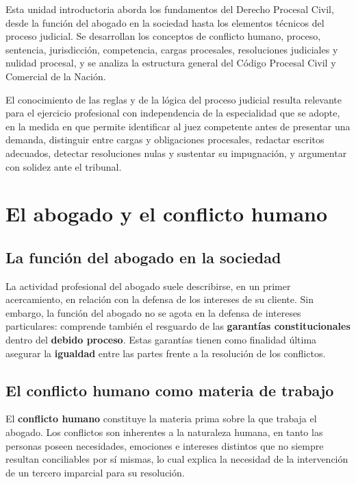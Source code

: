 \documentclass[12pt,oneside]{book}
\begin{document}
Esta unidad introductoria aborda los fundamentos del Derecho Procesal Civil, desde la función del abogado en la sociedad hasta los elementos técnicos del proceso judicial. Se desarrollan los conceptos de conflicto humano, proceso, sentencia, jurisdicción, competencia, cargas procesales, resoluciones judiciales y nulidad procesal, y se analiza la estructura general del Código Procesal Civil y Comercial de la Nación.

El conocimiento de las reglas y de la lógica del proceso judicial resulta relevante para el ejercicio profesional con independencia de la especialidad que se adopte, en la medida en que permite identificar al juez competente antes de presentar una demanda, distinguir entre cargas y obligaciones procesales, redactar escritos adecuados, detectar resoluciones nulas y sustentar su impugnación, y argumentar con solidez ante el tribunal.

\section{El abogado y el conflicto humano}

\subsection{La función del abogado en la sociedad}

La actividad profesional del abogado suele describirse, en un primer acercamiento, en relación con la defensa de los intereses de su cliente. Sin embargo, la función del abogado no se agota en la defensa de intereses particulares: comprende también el resguardo de las \textbf{garantías constitucionales} dentro del \textbf{debido proceso}. Estas garantías tienen como finalidad última asegurar la \textbf{igualdad} entre las partes frente a la resolución de los conflictos.

\subsection{El conflicto humano como materia de trabajo}

El \textbf{conflicto humano} constituye la materia prima sobre la que trabaja el abogado. Los conflictos son inherentes a la naturaleza humana, en tanto las personas poseen necesidades, emociones e intereses distintos que no siempre resultan conciliables por sí mismas, lo cual explica la necesidad de la intervención de un tercero imparcial para su resolución.
\end{document}
